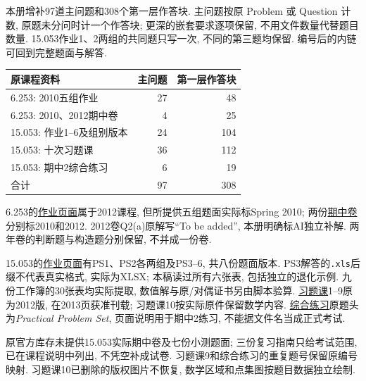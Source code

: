 \label{chap:assessment-sources}
本册增补97道主问题和308个第一层作答块. 主问题按原 Problem 或 Question 计数, 原题未分问时计一个作答块; 更深的嵌套要求逐项保留, 不用文件数量代替题目数量. 15.053作业1、2两组的共同题只写一次, 不同的第三题均保留. 编号后的内链可回到完整题面与解答.

\begin{center}
\begin{tabular}{lrr}
\toprule
原课程资料 & 主问题 & 第一层作答块\\
\midrule
6.253: 2010五组作业 &27&48\\
6.253: 2010、2012期中卷 &4&25\\
15.053: 作业1--6及组别版本 &24&104\\
15.053: 十次习题课 &36&112\\
15.053: 期中2综合练习 &6&19\\
\midrule
合计 &97&308\\
\bottomrule
\end{tabular}
\end{center}

6.253的\href{https://ocw.mit.edu/courses/6-253-convex-analysis-and-optimization-spring-2012/pages/assignments/}{作业页面}属于2012课程, 但所提供五组题面实际标Spring 2010; 两份\href{https://ocw.mit.edu/courses/6-253-convex-analysis-and-optimization-spring-2012/pages/exams/}{期中卷}分别标2010和2012. 2012卷Q2(a)原解写“To be added”, 本册明确标AI独立补解. 两年卷的判断题与构造题分别保留, 不并成一份卷.

15.053的\href{https://ocw.mit.edu/courses/15-053-optimization-methods-in-management-science-spring-2013/pages/assignments/}{作业页面}有PS1、PS2各两组及PS3--6, 共八份题面版本. PS3解答的\texttt{.xls}后缀不代表真实格式, 实际为XLSX; 本稿读过所有六张表, 包括独立的退化示例. 九份工作簿的30张表均实际提取, 数值解与原/对偶证书另由脚本验算. \href{https://ocw.mit.edu/courses/15-053-optimization-methods-in-management-science-spring-2013/pages/recitations/}{习题课}1--9原为2012版, 在2013页获准刊载; 习题课10按实际原件保留数学内容. \href{https://ocw.mit.edu/courses/15-053-optimization-methods-in-management-science-spring-2013/pages/study-materials/}{综合练习}原题头为\emph{Practical Problem Set}, 页面说明用于期中2练习, 不能据文件名当成正式考试.

原官方库存未提供15.053实际期中卷及七份小测题面; 三份复习指南只给考试范围, 已在课程说明中列出, 不凭空补成试卷. 习题课9和综合练习的重复题号保留原编号映射. 习题课10已删除的版权图片不恢复, 数学区域和点集图按题目数据独立绘制.

